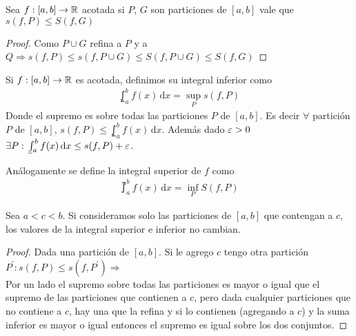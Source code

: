 \begin{corollary}
  Sea \(f: [a, b] \to \mathbb{R} \) acotada si \(P\), \(G\) son particiones de \([a, b]\) vale que \(s(f, P) \leq S(f, G)\)
  \begin{proof}
    Como \(P \cup G\) refina a \(P\) y a \(Q \Rightarrow s(f, P) \leq s(f, P \cup G) \leq S(f, P \cup G) \leq S(f, G)\)
  \end{proof}
\end{corollary}

\begin{definition}
  Si \(f: [a, b] \to \mathbb{R} \) es acotada, definimos su integral inferior como \begin{align*}
    \lowint_a^b f(x)\,\mathrm{d}x = \sup_P s(f, P)
  \end{align*}
  Donde el supremo es sobre todas las particiones \(P\) de \([a, b]\). Es decir \(\forall \) partición \(P\) de \([a, b]\), \(s(f, P) \leq \lowint_a^b f(x)\, \mathrm{d}x\).
  Además dado \(\varepsilon > 0\) \(\exists P : \lowint_a^b f(x)\, \mathrm{d}x \leq s(f, P) + \e \).
\end{definition}

\begin{definition}
  Análogamente se define la integral superior de \(f\) como \begin{align*}
    \upint_a^b f(x)\, \mathrm{d}x = \inf_P S(f, P)
  \end{align*}
\end{definition}

\begin{lemma}
  Sea \(a < c < b\). Si consideramos solo las particiones de \([a, b]\) que contengan a \(c\), los valores de la integral superior e inferior no cambian.
  \begin{proof}
    Dada una partición de \([a, b]\). Si le agrego \(c\) tengo otra partición \(P^{\prime} : s(f, P) \leq s(f, P^{\prime}) \Rightarrow \) \\
    Por un lado el supremo sobre todas las particiones es mayor o igual que el supremo de las particiones que contienen a \(c\), pero dada cualquier particiones que no contiene a \(c\),
    hay una que la refina y si lo contienen (agregando a \(c\)) y la suma inferior es mayor o igual entonces el supremo es igual sobre los dos conjuntos.
  \end{proof}
\end{lemma}

